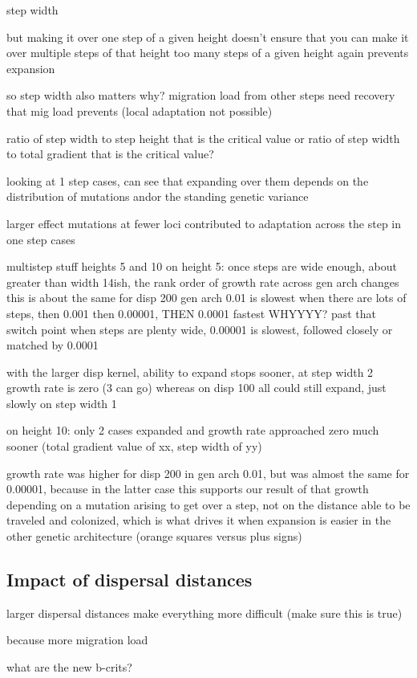 step width

	but making it over one step of a given height doesn't ensure that you can make it over multiple steps of that height
	too many steps of a given height again prevents expansion
	
	so step width also matters
		why?
		migration load from other steps
		need recovery that mig load prevents (local adaptation not possible)
		
		ratio of step width to step height that is the critical value
		or ratio of step width to total gradient that is the critical value?




looking at 1 step cases, can see that expanding over them depends on the distribution of mutations and\/or the standing genetic variance

larger effect mutations at fewer loci contributed to adaptation across the step in one step cases





multistep stuff heights 5 and 10
on height 5:
once steps are wide enough, about greater than width 14ish, the rank order of growth rate across gen arch changes
this is about the same for disp 200
gen arch 0.01 is slowest when there are lots of steps, then 0.001 then 0.00001, THEN 0.0001 fastest WHYYYY?
past that switch point when steps are plenty wide, 0.00001 is slowest, followed closely or matched by 0.0001

with the larger disp kernel, ability to expand stops sooner, at step width 2 growth rate is zero (3 can go) whereas on disp 100 all could still expand, just slowly on step width 1


on height 10:
only 2 cases expanded and growth rate approached zero much sooner (total gradient value of xx, step width of yy)

growth rate was higher for disp 200 in gen arch 0.01, but was almost the same for 0.00001, because in the latter case this supports our result of that growth depending on a mutation arising to get over a step, not on the distance able to be traveled and colonized, which is what drives it when expansion is easier in the other genetic architecture (orange squares versus plus signs)



\subsection{Impact of dispersal distances}

larger dispersal distances make everything more difficult (make sure this is true)

because more migration load

what are the new b-crits?



